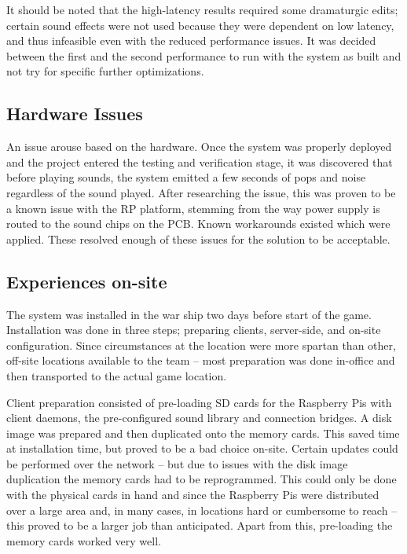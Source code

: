 It should be noted that the high-latency results required some
dramaturgic edits; certain sound effects were not used because they
were dependent on low latency, and thus infeasible even with the
reduced performance issues. It was decided between the first and the
second performance to run with the system as built and not try for
specific further optimizations.

\subsection{Hardware Issues}
\label{sec:hardware-issues}
An issue arouse based on the hardware. Once the system was properly deployed and the project entered
the testing and verification stage, it was discovered that before playing sounds, the system emitted a few seconds of pops and noise regardless of the sound played. After researching the issue, this was proven to be a known issue with the RP platform, stemming from the way power supply is routed to the sound chips on the PCB\@. Known workarounds existed which were applied\cite{rpi-bug-128}. These resolved enough of these issues for the solution to be acceptable.

\subsection{Experiences on-site}
\label{sec:experiences-on-site}

The system was installed in the war ship two days before start of the game. Installation was done in three steps; preparing clients, server-side, and on-site configuration. Since circumstances at the location were more spartan than other, off-site locations available to the team -- most preparation was done in-office and then transported to the actual game location. 

Client preparation consisted of pre-loading SD cards for the Raspberry Pis with client daemons, the pre-configured sound library and connection bridges. A disk image was prepared and then duplicated onto the memory cards. This saved time at installation time, but proved to be a bad choice on-site. Certain updates could be performed over the network -- but due to issues with the disk image duplication the memory cards had to be reprogrammed. This could only be done with the physical cards in hand and since the Raspberry Pis were distributed over a large area and, in many cases, in locations hard or cumbersome to reach -- this proved to be a larger job than anticipated. Apart from this, pre-loading the memory cards worked very well. 

